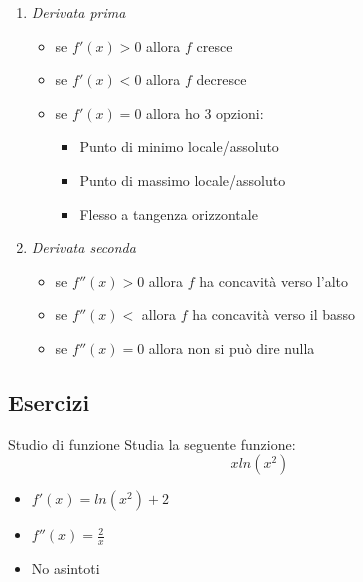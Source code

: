 \begin{enumerate}
	\item \textit{Derivata prima}
	      \begin{itemize}
		      \item se $ f'\left(x\right) > 0 $ allora $ f $ cresce
		      \item se $ f'\left(x\right) < 0 $ allora $ f $ decresce
		      \item se $ f'\left(x\right) = 0 $ allora ho 3 opzioni:
		            \begin{itemize}
			            \item Punto di minimo locale/assoluto
			            \item Punto di massimo locale/assoluto
			            \item Flesso a tangenza orizzontale
		            \end{itemize}
	      \end{itemize}
	\item \textit{Derivata seconda}
	      \begin{itemize}
		      \item se $ f''\left(x\right) > 0 $ allora $ f $ ha concavità verso l'alto
		      \item se $ f''\left(x\right) < $ allora $ f $ ha concavità verso il basso
		      \item se $ f''\left(x\right) = 0 $ allora non si può dire nulla
	      \end{itemize}
\end{enumerate}
\subsection{Esercizi}
\begin{esercizio}{Studio di funzione}
	Studia la seguente funzione:
	\[
		x ln\left(x^2 \right)
	\]
\end{esercizio}
\vskip3mm
\begin{itemize}
	\item $ f'\left(x\right) = ln\left(x^2 \right) + 2 $
	\item $ f''\left(x\right) = \frac{2}{x} $
	\item No asintoti
\end{itemize}


